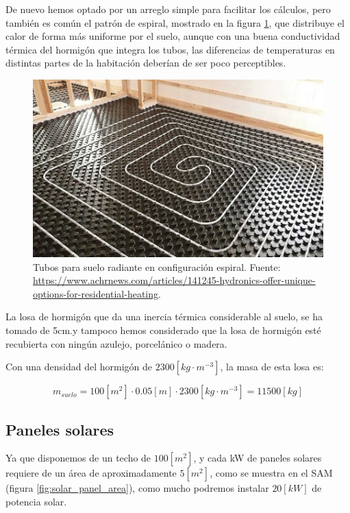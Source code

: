 De nuevo hemos optado por un arreglo simple para facilitar los cálculos, pero
también es común el patrón de espiral, mostrado en la figura
\ref{fig:spiral_pattern_floor}, que distribuye el calor de forma más uniforme
por el suelo, aunque con una buena conductividad térmica del hormigón que
integra los tubos, las diferencias de temperaturas en distintas partes de la
habitación deberían de ser poco perceptibles.

\begin{figure}[h] \centering
	\centering
	\includegraphics[width=1\textwidth]{./capitulos/resultados_discusion/images/spiral_pattern_floor.jpg}
	\caption{Tubos para suelo radiante en configuración espiral. Fuente: \url{https://www.achrnews.com/articles/141245-hydronics-offer-unique-options-for-residential-heating}.}
	\label{fig:spiral_pattern_floor}
\end{figure}

La losa de hormigón que da una inercia térmica considerable al suelo, se ha
tomado de 5cm.y tampoco hemos considerado que la losa de hormigón esté
recubierta con ningún azulejo, porcelánico o madera.

Con una densidad del hormigón de $2300[kg\cdot m^{-3}]$, la masa de esta losa es:

\begin{equation}
	m_{suelo} = 100[m^2] \cdot 0.05[m] \cdot 2300[kg\cdot m^{-3}] = 11500[kg]
\end{equation}


\subsection{Paneles solares}

Ya que disponemos de un techo de $100[m^2]$, y cada kW de paneles solares
requiere de un área de aproximadamente $5[m^2]$, como se muestra en el SAM
(figura \ref{fig:solar_panel_area}), como mucho podremos instalar $20[kW]$ de
potencia solar.

